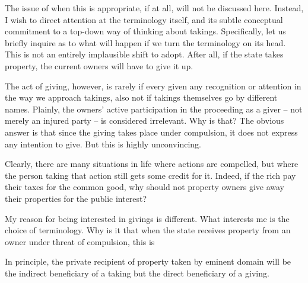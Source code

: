 The issue of when this is appropriate, if at all, will not be discussed here. Instead, I wish to direct attention at the terminology itself, and its subtle conceptual commitment to a top-down way of thinking about takings. Specifically, let us briefly inquire as to what will happen if we turn the terminology on its head. This is not an entirely implausible shift to adopt. After all, if the state takes property, the current owners will have to give it up. 

The act of giving, however, is rarely if every given any recognition or attention in the way we approach takings, also not if takings themselves go by different names. Plainly, the owners' active participation in the proceeding as a giver -- not merely an injured party -- is considered irrelevant. Why is that? The obvious answer is that since the giving takes place under compulsion, it does not express any intention to give. But this is highly unconvincing. 

Clearly, there are many situations in life where actions are compelled, but where the person taking that action still gets some credit for it. Indeed, if the rich pay their taxes for the common good, why should not property owners give away their properties for the public interest? 




My reason for being interested in givings is different. What interests me is the choice of terminology. Why is it that when the state receives property from an owner under threat of compulsion, this is


In principle, the private recipient of property taken by eminent domain will be the indirect beneficiary of a taking but the direct beneficiary of a giving. 

